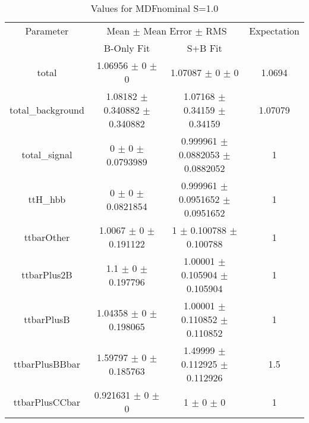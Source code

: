 \begin{table}
\centering
\caption{Values for MDFnominal S=1.0}
\begin{tabular}{cccc}
\toprule
Parameter & \multicolumn{2}{c}{Mean $\pm$ Mean Error $\pm$ RMS} & Expectation\\
 & B-Only Fit & S+B Fit & \\
\midrule
total & \num{1.06956} $\pm$ \num{0} $\pm$ \num{0} & \num{1.07087} $\pm$ \num{0} $\pm$ \num{0} & \num{1.0694}\\
total\_background & \num{1.08182} $\pm$ \num{0.340882} $\pm$ \num{0.340882} & \num{1.07168} $\pm$ \num{0.34159} $\pm$ \num{0.34159} & \num{1.07079}\\
total\_signal & \num{0} $\pm$ \num{0} $\pm$ \num{0.0793989} & \num{0.999961} $\pm$ \num{0.0882053} $\pm$ \num{0.0882052} & \num{1}\\
ttH\_hbb & \num{0} $\pm$ \num{0} $\pm$ \num{0.0821854} & \num{0.999961} $\pm$ \num{0.0951652} $\pm$ \num{0.0951652} & \num{1}\\
ttbarOther & \num{1.0067} $\pm$ \num{0} $\pm$ \num{0.191122} & \num{1} $\pm$ \num{0.100788} $\pm$ \num{0.100788} & \num{1}\\
ttbarPlus2B & \num{1.1} $\pm$ \num{0} $\pm$ \num{0.197796} & \num{1.00001} $\pm$ \num{0.105904} $\pm$ \num{0.105904} & \num{1}\\
ttbarPlusB & \num{1.04358} $\pm$ \num{0} $\pm$ \num{0.198065} & \num{1.00001} $\pm$ \num{0.110852} $\pm$ \num{0.110852} & \num{1}\\
ttbarPlusBBbar & \num{1.59797} $\pm$ \num{0} $\pm$ \num{0.185763} & \num{1.49999} $\pm$ \num{0.112925} $\pm$ \num{0.112926} & \num{1.5}\\
ttbarPlusCCbar & \num{0.921631} $\pm$ \num{0} $\pm$ \num{0} & \num{1} $\pm$ \num{0} $\pm$ \num{0} & \num{1}\\
\bottomrule
\end{tabular}
\end{table}